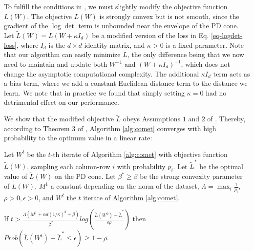 \documentclass[twoside,11pt]{article}
\newcommand\mat[1]{{#1}}
\newcommand{\W}{\mat{W}}
\newcommand{\tL}{\tilde{L}(\W)}
\begin{document}
To fulfill the conditions in \citep{richtarik2013optimal}, we must slightly modify the objective function $L({\W})$. The objective $L(\W)$ is strongly convex but is not smooth, since the gradient of the $\log \det$ term is unbounded near the envelope of the PD cone. Let $\tilde{L}({\W}) = L({\W + \kappa I_d})$ be a modified version of the loss in Eq. \ref{eq-logdet-loss}, where $I_d$ is the $d \times d$ identity matrix, and $\kappa>0$ is a fixed parameter.
Note that our algorithm can easily minimize $\tilde{L}$, the only difference being that we now need to maintain and update both $\W^{-1}$ and $(\W+\kappa I_d)^{-1}$, which does not change the asymptotic computational complexity. The additional $\kappa I_d$ term acts as a bias term, where we add a constant Euclidean distance term to the distance we learn. We note that in practice we found that simply setting $\kappa=0$ had no detrimental effect on our performance. 

We show that the modified objective $\tilde{L}$ obeys Assumptions $1$ and $2$ of \citet{richtarik2013optimal}. Thereby, according to Theorem 3 of \citeauthor{richtarik2013optimal}, Algorithm \ref{alg:comet} converges with high probability to the optimum value in a linear rate:

\begin{theorem}
Let $\W^t$ be the $t$-th iterate of Algorithm \ref{alg:comet} with objective function $\tL$, sampling each column-row $i$ with probability $p_i$. Let $\tilde{L}^*$ be the optimal value of $\tL$ on the PD cone. Let $\beta^* \geq \beta$ be the strong convexity parameter of $\tL$, $M^1$ a constant depending on the norm of the dataset, $\Lambda = \max_i \frac{1}{p_i}$, $\rho >0, \epsilon>0$, and $W^t$ the $t$ iterate of Algorithm \ref{alg:comet}.

If $t > \frac{\Lambda (M^1 + \alpha d (1/\kappa)^2 + \beta)}{\beta^*} log \left( \frac{\tilde{L}(W^0) - \tilde{L}^*}{\epsilon \rho}\right)$ then $Prob(\tilde{L}(\W^t) - \tilde{L}^* \leq \epsilon) \geq 1-\rho$.
\end{theorem}
\end{document}
